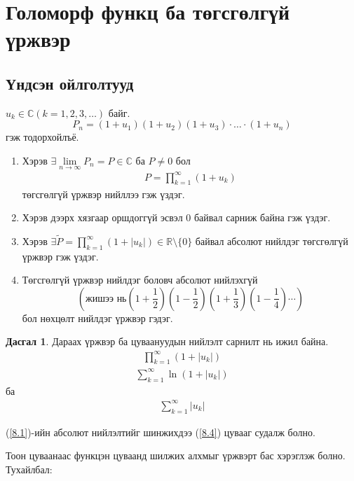 \chapter{Голоморф функц ба төгсгөлгүй үржвэр
}
\section{Үндсэн ойлголтууд}
\begin{dfn}
$u_k\in\mathbb{C}(k=1,2,3,\ldots)$ байг. 
$$P_n=(1+u_1)(1+u_2)(1+u_3)\cdot \ldots \cdot (1+u_n)$$ гэж тодорхойлъё.
\begin{enumerate} \label{8.1}
    \item [a)] Хэрэв $\exists \lim\limits_{n\rightarrow \infty} P_n=P\in \mathbb{C}$ ба $P\neq 0$ бол 
    \begin{eqnarray}
     P=\prod\limits_{k=1}^\infty (1+u_k)
    \end{eqnarray}  төгсгөлгүй үржвэр  нийллээ гэж үздэг.
 \item [б)] Хэрэв дээрх хязгаар оршдоггүй эсвэл $0$ байвал сарниж байна гэж үздэг.
  \item [в)] Хэрэв $\exists \tilde{P}=\prod\limits_{k=1}^\infty (1+|u_k|)\in\mathbb{R}\setminus \{0\}$ байвал абсолют нийлдэг төгсгөлгүй үржвэр гэж үздэг.
  \item [г)] Төгсгөлгүй үржвэр нийлдэг боловч абсолют нийлэхгүй
  $$\left( \text{жишээ нь} \left(1+\frac{1}{2}\right)\left(1-\frac{1}{2}\right) \left(1+\frac{1}{3}\right) \left(1-\frac{1}{4}\right)\cdots \right)$$
  бол нөхцөлт нийлдэг үржвэр гэдэг.
\end{enumerate}
\end{dfn}
\textbf{Дасгал 1}. Дараах үржвэр ба цуваануудын нийлэлт сарнилт нь ижил байна. 
\begin{eqnarray}
 \prod\limits_{k=1}^\infty (1+|u_k|)
\end{eqnarray}
\begin{eqnarray}
 \sum\limits_{k=1}^\infty \ln (1+|u_k|)
\end{eqnarray}
ба 
\begin{eqnarray} \label{8.4}
 \sum\limits_{k=1}^\infty |u_k|
\end{eqnarray}
\begin{cor}
(\ref{8.1})-ийн абсолют нийлэлтийг шинжихдээ (\ref{8.4}) цувааг судалж болно.

Тоон цуваанаас функцэн цуваанд шилжих алхмыг үржвэрт бас хэрэглэж болно. Тухайлбал:
\end{cor}
